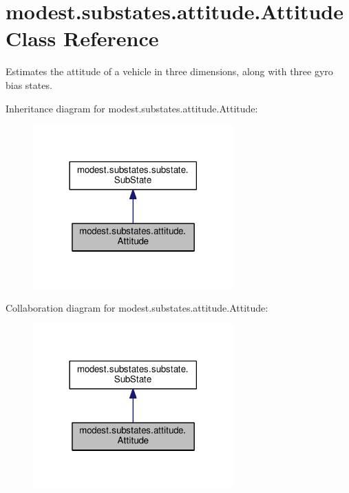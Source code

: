 \hypertarget{classmodest_1_1substates_1_1attitude_1_1Attitude}{}\section{modest.\+substates.\+attitude.\+Attitude Class Reference}
\label{classmodest_1_1substates_1_1attitude_1_1Attitude}


Estimates the attitude of a vehicle in three dimensions, along with three gyro bias states.  




Inheritance diagram for modest.\+substates.\+attitude.\+Attitude\+:
\nopagebreak
\begin{figure}[H]
\begin{center}
\leavevmode
\includegraphics[width=218pt]{classmodest_1_1substates_1_1attitude_1_1Attitude__inherit__graph}
\end{center}
\end{figure}


Collaboration diagram for modest.\+substates.\+attitude.\+Attitude\+:
\nopagebreak
\begin{figure}[H]
\begin{center}
\leavevmode
\includegraphics[width=218pt]{classmodest_1_1substates_1_1attitude_1_1Attitude__coll__graph}
\end{center}
\end{figure}

